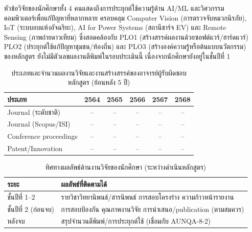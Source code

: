 หัวข้อวิจัยของนักศึกษาทั้ง 4 คนแสดงถึงการประยุกต์ใช้ความรู้ด้าน AI/ML และวิศวกรรมคอมพิวเตอร์เพื่อแก้ปัญหาที่หลากหลาย ครอบคลุม Computer Vision (การตรวจจับหมวกนิรภัย), IoT (ระบบอบแห้งอัจฉริยะ), AI for Power Systems (สถานีชาร์จ EV) และ Remote Sensing (ภาพถ่ายดาวเทียม) ซึ่งสอดคล้องกับ PLO1 (สร้างสรรค์ผลงานด้วยซอฟต์แวร์/ฮาร์ดแวร์) PLO2 (ประยุกต์ใช้แก้ปัญหาชุมชน/ท้องถิ่น) และ PLO3 (สร้างองค์ความรู้หรือต้นแบบนวัตกรรม) ของหลักสูตร ยังไม่มีตัวเลขผลงานตีพิมพ์ในรอบประเมินนี้ เนื่องจากนักศึกษายังอยู่ในชั้นปีที่ 1

\begin{table}[H]
  \centering
  \caption{ประเภทและจำนวนผลงานวิจัยและงานสร้างสรรค์ของอาจารย์ผู้รับผิดชอบหลักสูตร (ย้อนหลัง 5 ปี)}
  \begin{tabularx}{\linewidth}{|>{\raggedright\arraybackslash}X|c|c|c|c|c|}
    \hline
    \rowcolor{gray!15}
    \textbf{ประเภท} & \textbf{2564} & \textbf{2565} & \textbf{2566} & \textbf{2567} & \textbf{2568} \\
    \hline
    Journal (ระดับชาติ)        & -- & -- & -- & -- & -- \\
    Journal (Scopus/ISI)        & -- & -- & -- & -- & -- \\
    Conference proceedings      & -- & -- & -- & -- & -- \\
    Patent/Innovation           & -- & -- & -- & -- & -- \\
    \hline
  \end{tabularx}
\end{table}

\begin{table}[H]
  \centering
  \caption{ทิศทางผลลัพธ์ด้านงานวิจัยของนักศึกษา (ระหว่างดำเนินหลักสูตร)}
  \label{tbl:c8_student_research}
  \begingroup
  \small
  \begin{tabularx}{\linewidth}{|>{\raggedright\arraybackslash}p{3.4cm}|Y|}
    \hline
    \textbf{ระยะ} & \textbf{ผลลัพธ์ที่ติดตามได้} \\
    \hline
    ชั้นปีที่ 1--2 & รายวิชาวิทยานิพนธ์/สารนิพนธ์ การสอบโครงร่าง ความก้าวหน้ารายงาน \\
    \hline
    ชั้นปีที่ 2 (ก่อนจบ) & การสอบป้องกัน คุณภาพงานวิจัย การนำเสนอ/publication (ตามสมควร) \\
    \hline
    หลังจบ & สรุปจำนวนตีพิมพ์/การประยุกต์ใช้ (เชื่อมกับ AUNQA-8-2) \\
    \hline
  \end{tabularx}
  \endgroup
\end{table}


